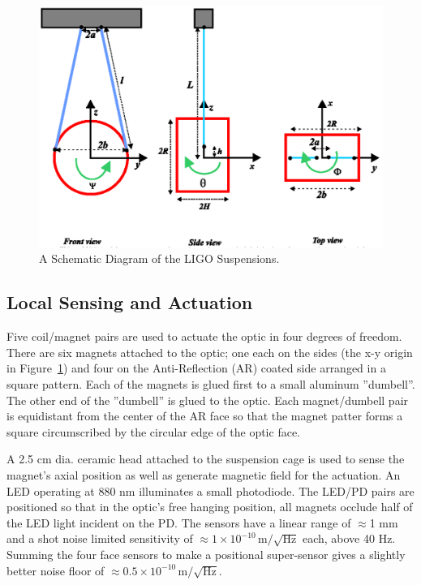 \begin{figure}[!h]
\centerline{
  \includegraphics[angle=0,width=6.5in]{Figures/AppG/SUS.png}}
\caption[Suspension Diagram]{A Schematic Diagram of the LIGO Suspensions.}
\label{fig:SUS}
\end{figure}

\subsection{Local Sensing and Actuation}
\label{sec:OSEMdesc}
Five coil/magnet pairs are used to actuate the optic in four degrees of freedom. There
are six magnets attached to the optic; one each on the sides 
(the x-y origin in Figure~\ref{fig:SUS}) and four on the Anti-Reflection (AR) coated side
arranged in a square pattern. Each of the magnets is glued first to a small aluminum
''dumbell''. The other end of the ''dumbell'' is glued to the optic. Each magnet/dumbell
pair is equidistant from the center of the AR face so that the magnet patter forms a square
circumscribed by the circular edge of the optic face.

A 2.5 cm dia. ceramic head attached to the suspension cage is used to sense the magnet's
axial position as well as generate magnetic field for the actuation. An LED operating at
880 nm illuminates a small photodiode. The LED/PD pairs are positioned so that in the optic's
free hanging position, all magnets occlude half of the LED light incident on the PD.
The sensors have a linear range of $\approx$1 mm and a shot noise limited sensitivity of
$\approx1 \times 10^{-10} \, \mbox{m}/\sqrt{\mbox{Hz}}$ each, above 40 Hz. Summing the
four face sensors to make a positional super-sensor gives a slightly better noise floor
of $\approx0.5 \times 10^{-10} \, \mbox{m}/\sqrt{\mbox{Hz}}$.

